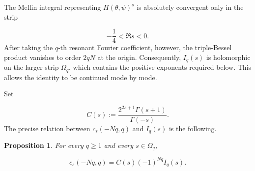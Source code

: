 \documentclass[11pt]{article}
\theoremstyle{plain}
\newtheorem{proposition}[theorem]{Proposition}
\theoremstyle{definition}
\theoremstyle{remark}
\begin{document}
The Mellin integral representing $H(\theta ,\psi )^s$ is absolutely convergent only in the strip

\[
  -\frac{1}{4} < \Re s < 0 .
\]
After taking the $q$-th resonant Fourier coefficient, however, the triple-Bessel product vanishes to order $2qN$ at the origin. Consequently, $I_q(s)$ is holomorphic on the larger strip $\Omega_q$, which contains the positive exponents required below. This allows the identity to be continued mode by mode.

Set

\[
  C(s) := \frac{2^{2s+1}\Gamma (s+1)}{\Gamma (-s)} .
\]
The precise relation between $c_s(-Nq, q)$ and $I_q(s)$ is the following.

\begin{proposition}\label{res:3.4}
For every $q \ge 1$ and every $s \in \Omega_q$,

\begin{equation}\label{eq:cI}
  c_s(-Nq, q) = C(s) (-1)^{Nq} I_q(s) .
\end{equation}
\end{proposition}
\end{document}
